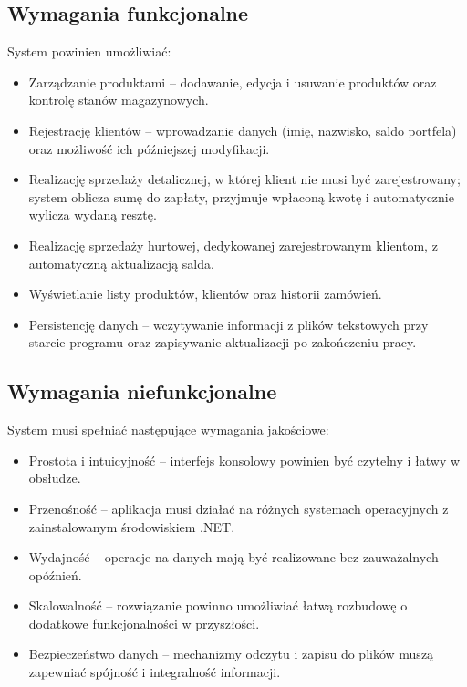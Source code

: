 \subsection*{Wymagania funkcjonalne}
System powinien umożliwiać:
\begin{itemize}
    \item Zarządzanie produktami – dodawanie, edycja i usuwanie produktów oraz kontrolę stanów magazynowych.
    \item Rejestrację klientów – wprowadzanie danych (imię, nazwisko, saldo portfela) oraz możliwość ich późniejszej modyfikacji.
    \item Realizację sprzedaży detalicznej, w której klient nie musi być zarejestrowany; system oblicza sumę do zapłaty, przyjmuje wpłaconą kwotę i automatycznie wylicza wydaną resztę.
    \item Realizację sprzedaży hurtowej, dedykowanej zarejestrowanym klientom, z automatyczną aktualizacją salda.
    \item Wyświetlanie listy produktów, klientów oraz historii zamówień.
    \item Persistencję danych – wczytywanie informacji z plików tekstowych przy starcie programu oraz zapisywanie aktualizacji po zakończeniu pracy.
\end{itemize}

\subsection*{Wymagania niefunkcjonalne}
System musi spełniać następujące wymagania jakościowe:
\begin{itemize}
    \item Prostota i intuicyjność – interfejs konsolowy powinien być czytelny i łatwy w obsłudze.
    \item Przenośność – aplikacja musi działać na różnych systemach operacyjnych z zainstalowanym środowiskiem .NET.
    \item Wydajność – operacje na danych mają być realizowane bez zauważalnych opóźnień.
    \item Skalowalność – rozwiązanie powinno umożliwiać łatwą rozbudowę o dodatkowe funkcjonalności w przyszłości.
    \item Bezpieczeństwo danych – mechanizmy odczytu i zapisu do plików muszą zapewniać spójność i integralność informacji.
\end{itemize}

